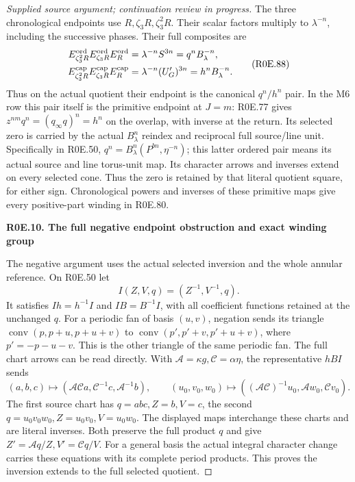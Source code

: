 \begin{proof}[Supplied source argument; continuation review in progress]
The three chronological endpoints use
\(R,\zeta_3R,\zeta_3^2R\). Their scalar factors multiply to
\(\lambda^{-n}\), including the successive phases. Their full
composites are
\[
 \begin{split}
 E_{\zeta_3^2R}^{\rm ord}E_{\zeta_3R}^{\rm ord}E_R^{\rm ord}
     &=\lambda^{-n}S^{3n}=q^n B_\lambda^{-n},\\
 E_{\zeta_3^2R}^{\rm cap}E_{\zeta_3R}^{\rm cap}E_R^{\rm cap}
     &=\lambda^{-n}(U'_G)^{3n}=h^n B_\lambda^{-n}.
 \end{split}                                                     \tag{R0E.88}
\]
Thus on the actual quotient their endpoint is the canonical
\(q^n/h^n\) pair. In the M6 row this pair itself is the primitive
endpoint at \(J=m\): R0E.77 gives
\(z^{nm}q^n=(q_\infty q)^n=h^n\) on the overlap, with inverse
at the return. Its selected zero is carried by the actual
\(B_\lambda^n\) reindex and reciprocal full source/line unit.
Specifically in R0E.50,
\(q^n=B_\lambda^n(P^{bn},\eta^{-n})\); this latter ordered pair
means its actual source and line torus-unit map. Its character
arrows and inverses extend on every selected cone. Thus the zero
is retained by that literal quotient square, for either sign.
Chronological powers and inverses of these primitive maps give
every positive-part winding in R0E.80.

\par

\medskip\noindent\textbf{R0E.10. The full negative endpoint obstruction and exact winding group}

\par\nobreak

The negative argument uses the actual selected inversion and the
whole annular reference. On R0E.50 let
\[
                    I(Z,V,q)=(Z^{-1},V^{-1},q).
 \tag{R0E.89}
\]
It satisfies \(Ih=h^{-1}I\) and \(IB=B^{-1}I\), with all coefficient
functions retained at the unchanged \(q\). For a periodic fan of
basis \((u,v)\), negation sends its triangle
\(\operatorname{conv}(p,p+u,p+u+v)\) to
\(\operatorname{conv}(p',p'+v,p'+u+v)\), where
\(p'=-p-u-v\). This is the other triangle of the same periodic fan.
The full chart arrows can be read directly. With
\(\mathcal A=\kappa g,\mathcal C=\alpha\eta\), the representative
\(hBI\) sends
\[
 (a,b,c)\mapsto(\mathcal A\mathcal C a,\mathcal C^{-1}c,
                         \mathcal A^{-1}b),\qquad
 (u_0,v_0,w_0)\mapsto((\mathcal A\mathcal C)^{-1}u_0,
                          \mathcal A w_0,\mathcal C v_0).
 \tag{R0E.90}
\]
The first source chart has \(q=abc,Z=b,V=c\), the second
\(q=u_0v_0w_0,Z=u_0v_0,V=u_0w_0\). The displayed maps interchange
these charts and are literal inverses. Both preserve the full
product \(q\) and give \(Z'=\mathcal A q/Z,V'=\mathcal C q/V\).
For a general basis the actual integral character change carries
these equations with its complete period products. This proves
the inversion extends to the full selected quotient.


\end{proof}
